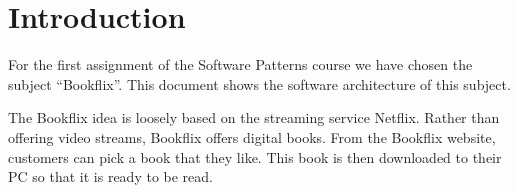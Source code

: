 \chapter*{Introduction}
For the first assignment of the Software Patterns course we have chosen the subject ``Bookflix''. This document shows the software architecture of this subject. 


The Bookflix idea is loosely based on the streaming service Netflix.
Rather than offering video streams, Bookflix offers digital books.
From the Bookflix website, customers can pick a book that they like.
This book is then downloaded to their PC so that it is ready to be read.